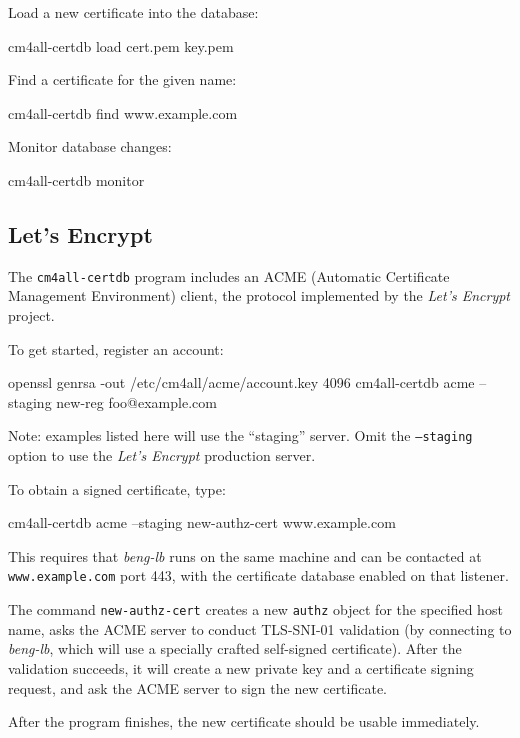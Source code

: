 \documentclass[a4paper,12pt]{article}
\begin{document}
Load a new certificate into the database:

\begin{verbatim*}
cm4all-certdb load cert.pem key.pem
\end{verbatim*}

Find a certificate for the given name:

\begin{verbatim*}
cm4all-certdb find www.example.com
\end{verbatim*}

Monitor database changes:

\begin{verbatim*}
cm4all-certdb monitor
\end{verbatim*}

\subsection{Let's Encrypt}

The \texttt{cm4all-certdb} program includes an ACME (Automatic
Certificate Management Environment) client, the protocol implemented
by the \emph{Let's Encrypt} project.

To get started, register an account:

\begin{verbatim*}
openssl genrsa -out /etc/cm4all/acme/account.key  4096
cm4all-certdb acme --staging new-reg foo@example.com
\end{verbatim*}

\small{Note: examples listed here will use the ``staging'' server.
  Omit the \texttt{--staging} option to use the \emph{Let's Encrypt}
  production server.}

To obtain a signed certificate, type:

\begin{verbatim*}
cm4all-certdb acme --staging new-authz-cert www.example.com
\end{verbatim*}

This requires that \emph{beng-lb} runs on the same machine and can be
contacted at \texttt{www.example.com} port 443, with the certificate
database enabled on that listener.

The command \texttt{new-authz-cert} creates a new \texttt{authz}
object for the specified host name, asks the ACME server to conduct
TLS-SNI-01 validation (by connecting to \emph{beng-lb}, which will use
a specially crafted self-signed certificate).  After the validation
succeeds, it will create a new private key and a certificate signing
request, and ask the ACME server to sign the new certificate.

After the program finishes, the new certificate should be usable
immediately.
\end{document}
